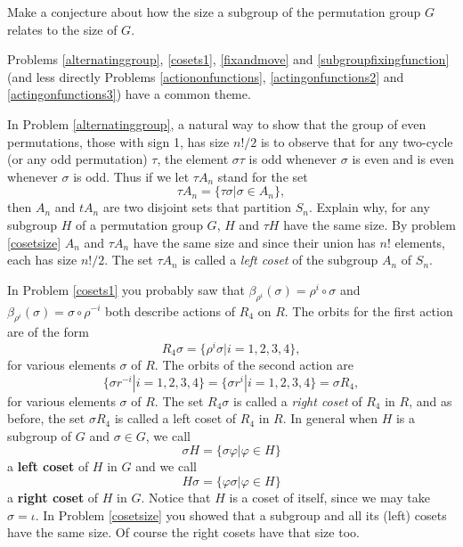\iteme Make a conjecture about how the size a subgroup of the permutation
group $G$ relates to the size of $G$. \label{sizeofsubgroup}
\ep

Problems \ref{alternatinggroup}, \ref{cosets1}, \ref{fixandmove} and
\ref{subgroupfixingfunction} (and less directly Problems
\ref{actiononfunctions}, \ref{actingonfunctions2} and
\ref{actingonfunctions3}) have a common theme.  

In Problem
\ref{alternatinggroup}, a natural way to show that the group of even
permutations, those with sign 1, has size $n!/2$ is to observe that for
any two-cycle (or any odd permutation) $\tau$, the element  $\sigma\tau$ is odd
whenever
$\sigma$ is even and is even whenever $\sigma$ is odd.  Thus if we let $\tau
A_n$ stand for the set
$$\tau A_n = \{\tau\sigma|\sigma \in A_n\},$$
then $A_n$ and $tA_n$ are two disjoint sets that partition $S_n$. 
\bp
\iteme Explain why, for any subgroup $H$ of a permutation group $G$, $H$
and
$\tau H$ have the same size.  \label{cosetsize}
\ep
By problem \ref{cosetsize} $A_n$ and $\tau A_n$ have the same size and
since their union has $n!$ elements, each has size $n!/2$.  The set $\tau
A_n$ is called a {\em left coset} of the subgroup $A_n$ of $S_n$. 

In Problem \ref{cosets1} you probably saw that $\beta_{\rho^i}(\sigma) =
\rho^i\circ\sigma$ and $\beta_{\rho^i}(\sigma) = \sigma\circ\rho^{-i}$
both describe actions of $R_4$ on $R$.  The orbits for the first action
are of the form
$$R_4\sigma=\{\rho^i \sigma| i=1,2,3,4\},$$
for various elements $\sigma$  of $R$.  The orbits of the second action
are
$$\{\sigma r^{-i}| i=1,2,3,4\} = \{\sigma r^i|i = 1,2,3,4\} = \sigma
R_4,$$ for various elements $\sigma$ of $R$.  The set $R_4\sigma$ is
called a {\em right coset} of $R_4$ in $R$, and as before, the set $\sigma
R_4$ is called a left coset of $R_4$ in $R$.  In general when $H$ is a
subgroup of $G$ and $\sigma \in G$, we call
$$\sigma H = \{\sigma \varphi|\varphi \in H\}$$
a {\bf left coset} of $H$ in $G$ and we call
$$H\sigma  = \{\varphi\sigma  |\varphi \in H\}$$
a {\bf right coset} of
$H$ in $G$.  Notice that $H$ is a coset of itself, since we may take
$\sigma=\iota$.  In Problem \ref{cosetsize} you showed that a subgroup
and all its (left) cosets have the same size.  Of course the right cosets
have that size too.

